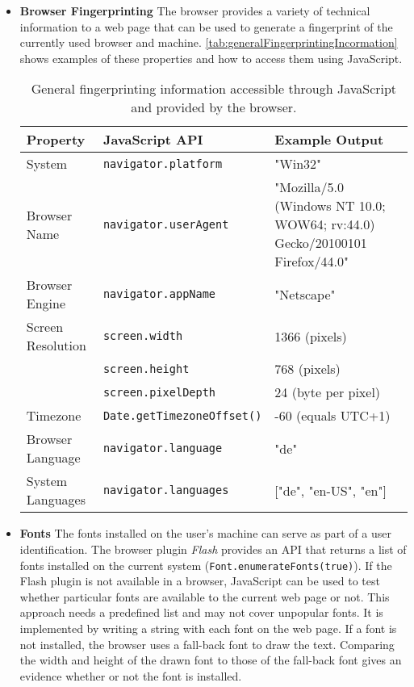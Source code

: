 	\begin{itemize}
		\item \textbf{Browser Fingerprinting} The browser provides a variety of technical information to a web page that can be used to generate a fingerprint of the currently used browser and machine. \autoref{tab:generalFingerprintingIncormation} shows examples of these properties and how to access them using JavaScript. 
		
		\begin{table}[h]
			\begin{tabular}{|l|l|p{}|} \hline
				\textbf{Property} & \textbf{JavaScript API} & \textbf{Example Output} \\ \hline
				System & \texttt{navigator.platform} & "Win32" \\ \hline
				Browser Name & \texttt{navigator.userAgent} & "Mozilla/5.0 (Windows NT 10.0; WOW64; rv:44.0) Gecko/20100101 Firefox/44.0" \\ \hline
				Browser Engine & \texttt{navigator.appName} & "Netscape" \\ \hline
				Screen Resolution & \texttt{screen.width} & 1366 (pixels) \\
				& \texttt{screen.height} & 768 (pixels) \\
				& \texttt{screen.pixelDepth} & 24 (byte per pixel) \\ \hline
				Timezone & \texttt{Date.getTimezoneOffset()} & -60 (equals UTC+1) \\ \hline
				Browser Language & \texttt{navigator.language} & "de" \\ \hline
				System Languages & \texttt{navigator.languages} & ["de", "en-US", "en"] \\ \hline
			\end{tabular}
			\caption{General fingerprinting information accessible through JavaScript and provided by the browser.}
			\label{tab:generalFingerprintingIncormation}
		\end{table}
		
		\item \textbf{Fonts} The fonts installed on the user's machine can serve as part of a user identification. The browser plugin \textit{Flash} provides an API that returns a list of fonts installed on the current system (\texttt{Font.enumerateFonts(true)})\cite{flashPlayerGetFonts}. If the Flash plugin is not available in a browser, JavaScript can be used to test whether particular fonts are available to the current web page or not. This approach needs a predefined list and may not cover unpopular fonts. It is implemented by writing a string with each font on the web page. If a font is not installed, the browser uses a fall-back font to draw the text. Comparing the width and height of the drawn font to those of the fall-back font gives an evidence whether or not the font is installed.
		

\end{itemize}
